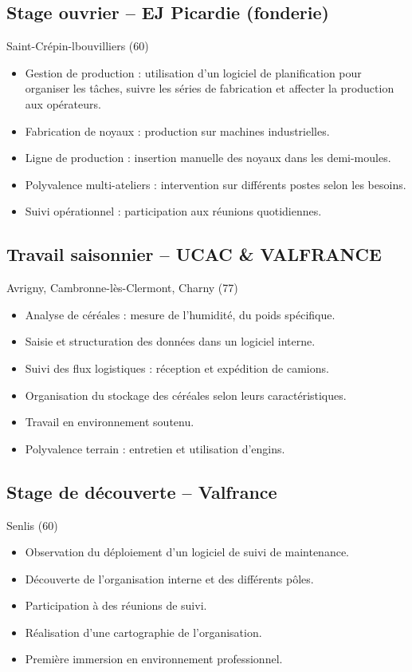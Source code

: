 \documentclass[a4paper,10pt]{article}
\begin{document}
\subsection*{Stage ouvrier – EJ Picardie (fonderie)}
Saint-Crépin-lbouvilliers (60)
\begin{itemize}
    \item Gestion de production : utilisation d'un logiciel de planification pour organiser les tâches, suivre les séries de fabrication et affecter la production aux opérateurs.
    \item Fabrication de noyaux : production sur machines industrielles.
    \item Ligne de production : insertion manuelle des noyaux dans les demi-moules.
    \item Polyvalence multi-ateliers : intervention sur différents postes selon les besoins.
    \item Suivi opérationnel : participation aux réunions quotidiennes.
\end{itemize}

\subsection*{Travail saisonnier – UCAC \& VALFRANCE}
Avrigny, Cambronne-lès-Clermont, Charny (77)
\begin{itemize}
    \item Analyse de céréales : mesure de l'humidité, du poids spécifique.
    \item Saisie et structuration des données dans un logiciel interne.
    \item Suivi des flux logistiques : réception et expédition de camions.
    \item Organisation du stockage des céréales selon leurs caractéristiques.
    \item Travail en environnement soutenu.
    \item Polyvalence terrain : entretien et utilisation d'engins.
\end{itemize}

\subsection*{Stage de découverte – Valfrance}
Senlis (60)
\begin{itemize}
    \item Observation du déploiement d'un logiciel de suivi de maintenance.
    \item Découverte de l'organisation interne et des différents pôles.
    \item Participation à des réunions de suivi.
    \item Réalisation d'une cartographie de l'organisation.
    \item Première immersion en environnement professionnel.
\end{itemize}
\end{document}
